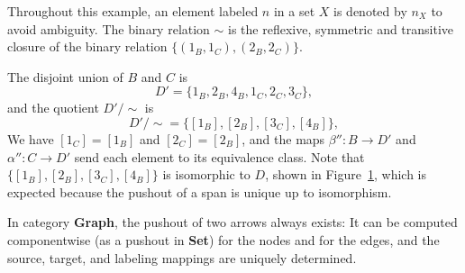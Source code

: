 \begin{example}
\begin{figure}[H]
{
      }
      \caption{}
      \label{fig:preliminaries:a_rewriting_step_dfjalsdkjflg}
  \end{figure}
    Throughout this example, an element labeled \(n\) in a set \(X\) is denoted by \(n_X\) to avoid ambiguity.        
    The binary relation \(\sim\) is the reflexive, symmetric and transitive closure of the binary relation $\{(1_B,1_C),(2_B,2_C)\}$.
 
    The disjoint union of \(B\) and \(C\) is
    \[ 
    D' \mathop{=} \{1_B,2_B,4_B,1_C,2_C,3_C\},
    \]
    and the quotient \(D'/\sim\) is
    \[
    D'/\sim \mathop{=} \{[1_B],[2_B],[3_C],[4_B]\},
    \]
    We have \([1_C]=[1_B]\) and \([2_C]=[2_B]\), and the maps
    \(\beta'' \mathop{\colon} B \mathop{\to} D'\) and \(\alpha'' \mathop{\colon} C \mathop{\to} D'\) send each element to its equivalence class. Note that \(\{[1_B],[2_B],[3_C],[4_B]\}\) is isomorphic to \(D\), shown in Figure~\ref{fig:preliminaries:a_rewriting_step_dfjalsdkjflg}, which is expected because the pushout of a span is unique up to isomorphism.
\end{example}

\begin{proposition}{\cite[p.188]{corradini1997algebraic}}
    \label{prop:pushout_graph_always_exists}
    In category \textbf{Graph}, the pushout of two arrows always exists: It can be computed componentwise (as a pushout in \textbf{Set}) for the nodes and for the edges, and the source, target, and labeling mappings are uniquely determined.
\end{proposition}

